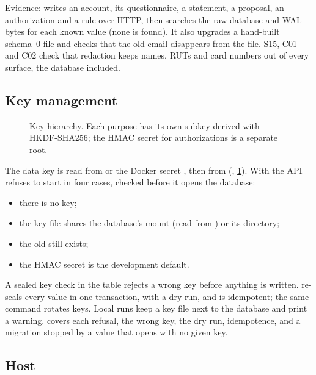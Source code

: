\documentclass[11pt,a4paper]{article}
\begin{document}
Evidence:  writes an account, its questionnaire, a statement, a
proposal, an authorization and a rule over HTTP, then searches the raw database and WAL bytes for each known value
(none is found). It also upgrades a hand-built schema~0 file and checks that the old email disappears from the file.
S15, C01 and C02 check that redaction keeps names, RUTs and card numbers out of every surface, the database included.

\subsection{Key management}

\begin{figure}[htbp]
  \centering
  
  \caption{Key hierarchy. Each purpose has its own subkey derived with HKDF-SHA256; the HMAC secret for authorizations
  is a separate root.}\label{fig:keys}
\end{figure}

The data key is read from  or the Docker secret , then from
 (, \cref{fig:keys}). With  the API refuses
to start in four cases, checked before it opens the database:
\begin{itemize}
  \item there is no key;
  \item the key file shares the database's mount (read from ) or its directory;
  \item the old  still exists;
  \item the HMAC secret is the development default.
\end{itemize}
A sealed key check in the  table rejects a wrong key before anything is written.
 re-seals every value in one transaction, with a dry run, and is idempotent; the same
command rotates keys. Local runs keep a key file next to the database and print a warning.
 covers each refusal, the wrong key, the dry run, idempotence, and a migration
stopped by a value that opens with no given key.

\subsection{Host}
\end{document}
